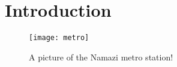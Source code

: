 \documentclass[12pt,]{article}
\begin{document}
\listoffigures
\section{Introduction}

 \begin{wrapfigure}{r}{0.5\textwidth}
  \begin{center}
    \texttt{[image: metro]}
  \end{center}
  \caption{A picture of the Namazi metro station!}
\end{wrapfigure}
\end{document}
